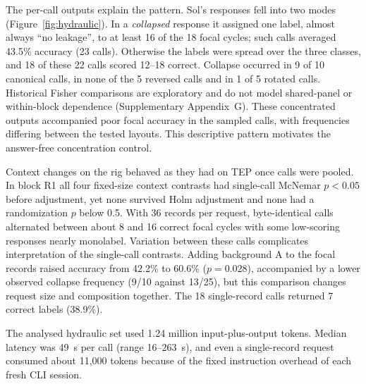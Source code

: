 \documentclass[11pt,a4paper]{article}
\begin{document}
The per-call outputs explain the pattern. Sol's responses fell into two modes (Figure~\ref{fig:hydraulic}). In a \emph{collapsed} response it assigned one label, almost always ``no leakage'', to at least 16 of the 18 focal cycles; such calls averaged 43.5\% accuracy (23 calls). Otherwise the labels were spread over the three classes, and 18 of these 22 calls scored 12--18 correct. Collapse occurred in 9 of 10 canonical calls, in none of the 5 reversed calls and in 1 of 5 rotated calls. Historical Fisher comparisons are exploratory and do not model shared-panel or within-block dependence (Supplementary Appendix~G). These concentrated outputs accompanied poor focal accuracy in the sampled calls, with frequencies differing between the tested layouts. This descriptive pattern motivates the answer-free concentration control.

Context changes on the rig behaved as they had on TEP once calls were pooled. In block R1 all four fixed-size context contrasts had single-call McNemar $p<0.05$ before adjustment, yet none survived Holm adjustment and none had a randomization $p$ below 0.5. With 36 records per request, byte-identical calls alternated between about 8 and 16 correct focal cycles with some low-scoring responses nearly monolabel. Variation between these calls complicates interpretation of the single-call contrasts. Adding background A to the focal records raised accuracy from 42.2\% to 60.6\% ($p=0.028$), accompanied by a lower observed collapse frequency (9/10 against 13/25), but this comparison changes request size and composition together. The 18 single-record calls returned 7 correct labels (38.9\%).

The analysed hydraulic set used 1.24 million input-plus-output tokens. Median latency was 49~s per call (range 16--263~s), and even a single-record request consumed about 11{,}000 tokens because of the fixed instruction overhead of each fresh CLI session.
\end{document}
